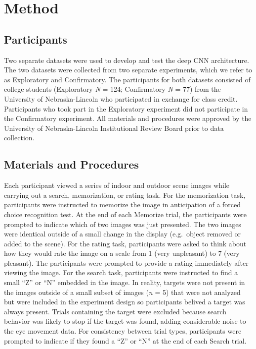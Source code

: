 \documentclass[
  english,
  man, donotrepeattitle,floatsintext]{apa6}
\begin{document}
\section{Method}
\subsection{Participants}

Two separate datasets were used to develop and test the deep CNN architecture. The two datasets were collected from two separate experiments, which we refer to as Exploratory and Confirmatory. The participants for both datasets consisted of college students (Exploratory \emph{N} = 124; Confirmatory \emph{N} = 77) from the University of Nebraska-Lincoln who participated in exchange for class credit. Participants who took part in the Exploratory experiment did not participate in the Confirmatory experiment. All materials and procedures were approved by the University of Nebraska-Lincoln Institutional Review Board prior to data collection.

\subsection{Materials and Procedures}

Each participant viewed a series of indoor and outdoor scene images while carrying out a search, memorization, or rating task. For the memorization task, participants were instructed to memorize the image in anticipation of a forced choice recognition test. At the end of each Memorize trial, the participants were prompted to indicate which of two images was just presented. The two images were identical outside of a small change in the display (e.g.~object removed or added to the scene). For the rating task, participants were asked to think about how they would rate the image on a scale from 1 (very unpleasant) to 7 (very pleasant). The participants were prompted to provide a rating immediately after viewing the image. For the search task, participants were instructed to find a small \enquote{Z} or \enquote{N} embedded in the image. In reality, targets were not present in the images outside of a small subset of images (\emph{n} = 5) that were not analyzed but were included in the experiment design so participants belived a target was always present. Trials containing the target were excluded because search behavior was likely to stop if the target was found, adding considerable noise to the eye movement data. For consistency between trial types, participants were prompted to indicate if they found a \enquote{Z} or \enquote{N} at the end of each Search trial.
\end{document}
